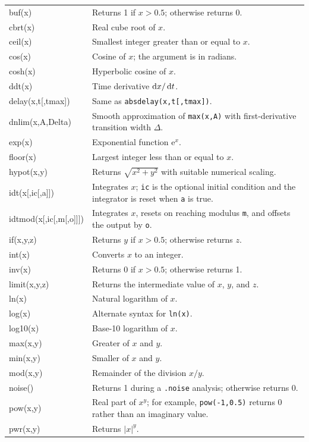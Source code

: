 \begin{longtable}{>{\ttfamily\raggedright\arraybackslash}p{}
                  >{\raggedright\arraybackslash}p{}}
buf(x) & Returns 1 if $x>0.5$; otherwise returns 0. \\
cbrt(x) & Real cube root of $x$. \\
ceil(x) & Smallest integer greater than or equal to $x$. \\
cos(x) & Cosine of $x$; the argument is in radians. \\
cosh(x) & Hyperbolic cosine of $x$. \\
ddt(x) & Time derivative $\mathop{}\!\mathrm{d} x/\mathop{}\!\mathrm{d} t$. \\
delay(x,t[,tmax]) & Same as \texttt{absdelay(x,t[,tmax])}. \\
dnlim(x,A,Delta) & Smooth approximation of \texttt{max(x,A)} with first-derivative transition width $\Delta$. \\
exp(x) & Exponential function $\mathrm{e}^{x}$. \\
floor(x) & Largest integer less than or equal to $x$. \\
hypot(x,y) & Returns $\sqrt{x^2+y^2}$ with suitable numerical scaling. \\
idt(x[,ic[,a]]) & Integrates $x$; \texttt{ic} is the optional initial condition and the integrator is reset when \texttt{a} is true. \\
idtmod(x[,ic[,m[,o]]]) & Integrates $x$, resets on reaching modulus \texttt{m}, and offsets the output by \texttt{o}. \\
if(x,y,z) & Returns $y$ if $x>0.5$; otherwise returns $z$. \\
int(x) & Converts $x$ to an integer. \\
inv(x) & Returns 0 if $x>0.5$; otherwise returns 1. \\
limit(x,y,z) & Returns the intermediate value of $x$, $y$, and $z$. \\
ln(x) & Natural logarithm of $x$. \\
log(x) & Alternate syntax for \texttt{ln(x)}. \\
log10(x) & Base-10 logarithm of $x$. \\
max(x,y) & Greater of $x$ and $y$. \\
min(x,y) & Smaller of $x$ and $y$. \\
mod(x,y) & Remainder of the division $x/y$. \\
noise() & Returns 1 during a \texttt{.noise} analysis; otherwise returns 0. \\
pow(x,y) & Real part of $x^y$; for example, \texttt{pow(-1,0.5)} returns 0 rather than an imaginary value. \\
pwr(x,y) & Returns $|x|^y$. \\

\end{longtable}

